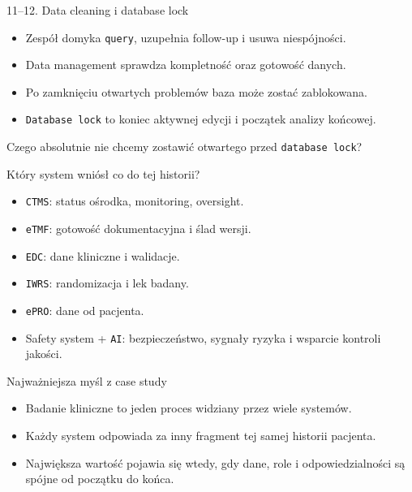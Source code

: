 \begin{frame}{11--12. Data cleaning i database lock}
  \begin{itemize}
    \item Zespół domyka \texttt{query}, uzupełnia follow-up i usuwa niespójności.
    \item Data management sprawdza kompletność oraz gotowość danych.
    \item Po zamknięciu otwartych problemów baza może zostać zablokowana.
    \item \texttt{Database lock} to koniec aktywnej edycji i początek analizy końcowej.
  \end{itemize}
  \begin{QuestionBox}
    Czego absolutnie nie chcemy zostawić otwartego przed \texttt{database lock}?
  \end{QuestionBox}
\end{frame}

\begin{frame}{Który system wniósł co do tej historii?}
  \begin{itemize}
    \item \texttt{CTMS}: status ośrodka, monitoring, oversight.
    \item \texttt{eTMF}: gotowość dokumentacyjna i ślad wersji.
    \item \texttt{EDC}: dane kliniczne i walidacje.
    \item \texttt{IWRS}: randomizacja i lek badany.
    \item \texttt{ePRO}: dane od pacjenta.
    \item Safety system + \texttt{AI}: bezpieczeństwo, sygnały ryzyka i wsparcie kontroli jakości.
  \end{itemize}
\end{frame}


\begin{frame}{Najważniejsza myśl z case study}
  \begin{itemize}
    \item Badanie kliniczne to jeden proces widziany przez wiele systemów.
    \item Każdy system odpowiada za inny fragment tej samej historii pacjenta.
    \item Największa wartość pojawia się wtedy, gdy dane, role i odpowiedzialności są spójne od początku do końca.
  \end{itemize}
\end{frame}
